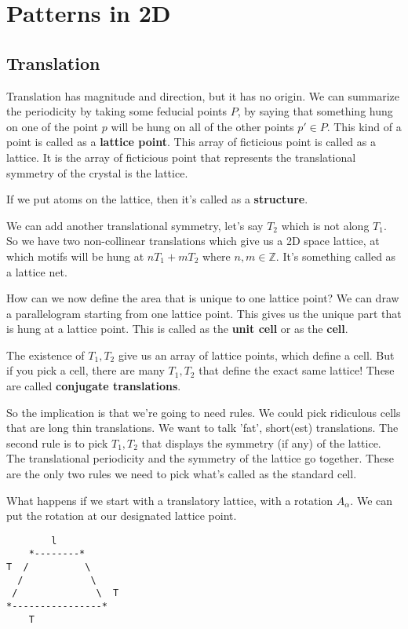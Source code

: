 \documentclass{book}
\newcommand{\Z}{\ensuremath{\mathbb{Z}}}
\theoremstyle{definition}
\begin{document}
\section{Patterns in 2D}

\subsection{Translation}
Translation has magnitude and direction, but it has no origin. We can summarize
the periodicity by taking some feducial points $P$, by saying that something hung
on one of the point $p$ will be hung on all of the other points $p' \in P$.
This kind of a point is called as a \textbf{lattice point}. This array of
ficticious point is called as a lattice. It is the array of ficticious point
that represents the translational symmetry of the crystal is the lattice.
                            
If we put atoms on the lattice, then it's called as a \textbf{structure}.

We can add another translational symmetry, let's say $T_2$ which is not along
$T_1$. So we have two non-collinear translations which give us a 2D space lattice,
at which motifs will be hung at $n T_1 + m T_2$ where $n, m \in \Z$. It's something
called as a lattice net.

How can we now define the area that is unique to one lattice point? We can
draw a parallelogram starting from one lattice point. This gives us the
unique part that is hung at a lattice point. This is called as the \textbf{unit cell}
or as the \textbf{cell}.

The existence of $T_1, T_2$ give us an array of lattice points, which define a
cell. But if you pick a cell, there are many $T_1, T_2$ that define
the exact same lattice! These are called \textbf{conjugate translations}.

So the implication is that we're going to need rules. We could pick ridiculous
cells that are long thin translations. We want to talk 'fat', short(est)
translations.  The second rule is to pick $T_1, T_2$ that displays the symmetry
(if any) of the lattice. The translational periodicity and the symmetry of the
lattice go together.  These are the only two rules we need to pick what's
called as the standard cell.

What happens if we start with a translatory lattice, with a rotation $A_\alpha$.
We can put the rotation at our designated lattice point. 

\begin{verbatim}
        l
    *--------*
T  /          \
  /            \
 /              \  T
*----------------*
    T
\end{verbatim}
\end{document}
